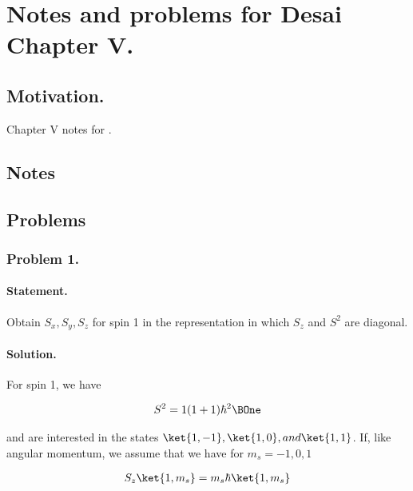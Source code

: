 
%

\chapter{Notes and problems for Desai Chapter V.}
\label{chap:desaiCh5}
{}
\date{Oct 18, 2010}

\beginArtWithToc

\section{Motivation.}

Chapter V notes for \cite{desai2009quantum}.

\section{Notes}
\section{Problems}

\subsection{Problem 1.}

\subsubsection{Statement.}
Obtain $S_x, S_y, S_z$ for spin 1 in the representation in which $S_z$ and $S^2$ are diagonal.

\subsubsection{Solution.}

For spin 1, we have

\begin{align}\label{eqn:desaiCh5:100}
S^2 = 1 (1+1) \hbar^2 \BOne
\end{align}

and are interested in the states $\ket{1,-1}, \ket{1, 0}, and \ket{1,1}$.  If, like angular momentum, we assume that we have for $m_s = -1,0,1$

\begin{align}\label{eqn:desaiCh5:101}
S_z \ket{1,m_s} = m_s \hbar \ket{1, m_s}
\end{align}

